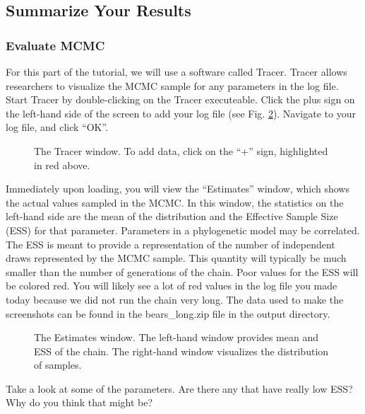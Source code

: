 \subsection{Summarize Your Results}\label{subsect:RB-SummarizeResults}

\medskip
\subsubsection{Evaluate MCMC}\label{subsub:RB-EvalMCMC}

For this part of the tutorial, we will use a software called Tracer.
Tracer allows researchers to visualize the MCMC sample for any parameters in the log file.
Start Tracer by double-clicking on the Tracer executeable.
Click the plus sign on the left-hand side of the screen to add your log file (see Fig. \ref{fig:tracer}).
Navigate to your log file, and click ``OK''.

\begin{figure}[h!]
\centering
{}
\caption{\small The Tracer window. To add data, click on the ``+'' sign, highlighted in red above.}
\label{fig:tracer}
\end{figure}
Immediately upon loading, you will view the ``Estimates'' window, which shows the actual values sampled in the MCMC.
In this window, the statistics on the left-hand side are the mean of the distribution and the Effective Sample Size (ESS) for that parameter.
Parameters in a phylogenetic model may be correlated.
The ESS is meant to provide a representation of the number of independent draws represented by the MCMC sample.
This quantity will typically be much smaller than the number of generations of the chain.
Poor values for the ESS will be colored red.
You will likely see a lot of red values in the log file you made today because we did not run the chain very long.
The data used to make the screenshots can be found in the bears\_long.zip file in the output directory.

\begin{figure}[h!]
\centering
{}
\caption{\small The Estimates window. The left-hand window provides mean and ESS of the chain. The right-hand window visualizes the distribution of samples.}
\label{fig:tracer}
\end{figure}
Take a look at some of the parameters.
Are there any that have really low ESS? Why do you think that might be?

